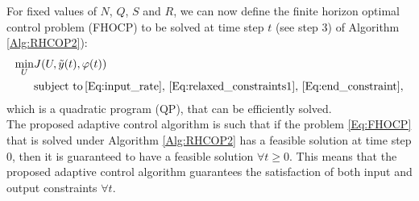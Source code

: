 \documentclass[10 pt, letterpaper]{article}
\newcommand{\beq}{\begin{equation}}
\newcommand{\eeq}{\end{equation}}
\begin{document}
For fixed values of $N$, $Q$, $S$ and $R$, we can now define the finite horizon optimal control problem (FHOCP) to be solved at time step $t$ (see step 3) of Algorithm \ref{Alg:RHCOP2}):
\beq \label{Eq:FHOCP}
\begin{aligned}
\min
\limits_{U} &J(U,\tilde{y}(t),\varphi (t))\\
&\text{subject to}\, \eqref{Eq:input_rate},\, \eqref{Eq:relaxed_constraints1}, \, \eqref{Eq:end_constraint},
\end{aligned}
\eeq
which is a quadratic program (QP), that can be efficiently solved.\\
The proposed adaptive control algorithm is such that if the problem \eqref{Eq:FHOCP} that is solved under Algorithm \ref{Alg:RHCOP2} has a feasible solution at time step $0$, then it is guaranteed to have a feasible solution $\forall t\geq 0$. This means that the proposed adaptive control algorithm guarantees the satisfaction of both input and output constraints $\forall t$.
\end{document}
